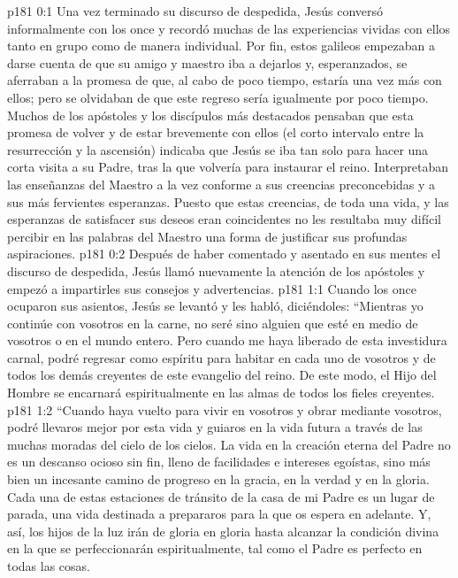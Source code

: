 \author{Comisión de seres intermedios}
\vs p181 0:1 Una vez terminado su discurso de despedida, Jesús conversó informalmente con los once y recordó muchas de las experiencias vividas con ellos tanto en grupo como de manera individual. Por fin, estos galileos empezaban a darse cuenta de que su amigo y maestro iba a dejarlos y, esperanzados, se aferraban a la promesa de que, al cabo de poco tiempo, estaría una vez más con ellos; pero se olvidaban de que este regreso sería igualmente por poco tiempo. Muchos de los apóstoles y los discípulos más destacados pensaban que esta promesa de volver y de estar brevemente con ellos (el corto intervalo entre la resurrección y la ascensión) indicaba que Jesús se iba tan solo para hacer una corta visita a su Padre, tras la que volvería para instaurar el reino. Interpretaban las enseñanzas del Maestro a la vez conforme a sus creencias preconcebidas y a sus más fervientes esperanzas. Puesto que estas creencias, de toda una vida, y las esperanzas de satisfacer sus deseos eran coincidentes no les resultaba muy difícil percibir en las palabras del Maestro una forma de justificar sus profundas aspiraciones.
\vs p181 0:2 Después de haber comentado y asentado en sus mentes el discurso de despedida, Jesús llamó nuevamente la atención de los apóstoles y empezó a impartirles sus consejos y advertencias.
\vs p181 1:1 Cuando los once ocuparon sus asientos, Jesús se levantó y les habló, diciéndoles: “Mientras yo continúe con vosotros en la carne, no seré sino alguien que esté en medio de vosotros o en el mundo entero. Pero cuando me haya liberado de esta investidura carnal, podré regresar como espíritu para habitar en cada uno de vosotros y de todos los demás creyentes de este evangelio del reino. De este modo, el Hijo del Hombre se encarnará espiritualmente en las almas de todos los fieles creyentes.
\vs p181 1:2 “Cuando haya vuelto para vivir en vosotros y obrar mediante vosotros, podré llevaros mejor por esta vida y guiaros en la vida futura a través de las muchas moradas del cielo de los cielos. La vida en la creación eterna del Padre no es un descanso ocioso sin fin, lleno de facilidades e intereses egoístas, sino más bien un incesante camino de progreso en la gracia, en la verdad y en la gloria. Cada una de estas estaciones de tránsito de la casa de mi Padre es un lugar de parada, una vida destinada a prepararos para la que os espera en adelante. Y, así, los hijos de la luz irán de gloria en gloria hasta alcanzar la condición divina en la que se perfeccionarán espiritualmente, tal como el Padre es perfecto en todas las cosas.
